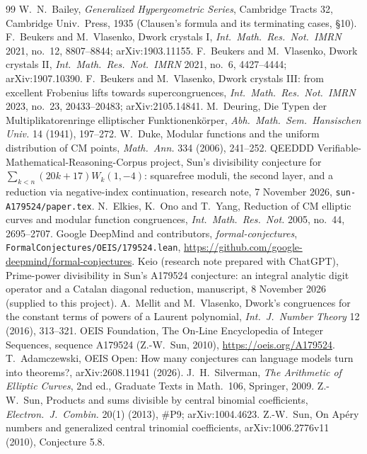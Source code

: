 \documentclass[11pt]{amsart}
\theoremstyle{definition}
\theoremstyle{remark}
\begin{document}
\begin{thebibliography}{99}
 W.~N.~Bailey, \emph{Generalized Hypergeometric Series}, Cambridge Tracts 32,
Cambridge Univ.\ Press, 1935 (Clausen's formula and its terminating cases, \S10).
 F.~Beukers and M.~Vlasenko, Dwork crystals I, \emph{Int.\ Math.\ Res.\ Not.\ IMRN}
2021, no.~12, 8807--8844; arXiv:1903.11155.
 F.~Beukers and M.~Vlasenko, Dwork crystals II, \emph{Int.\ Math.\ Res.\ Not.\ IMRN}
2021, no.~6, 4427--4444; arXiv:1907.10390.
 F.~Beukers and M.~Vlasenko, Dwork crystals III: from excellent Frobenius lifts towards
supercongruences, \emph{Int.\ Math.\ Res.\ Not.\ IMRN} 2023, no.~23, 20433--20483;
arXiv:2105.14841.
 M.~Deuring, Die Typen der Multiplikatorenringe elliptischer Funktionenk\"orper,
\emph{Abh.\ Math.\ Sem.\ Hansischen Univ.} 14 (1941), 197--272.
 W.~Duke, Modular functions and the uniform distribution of CM points,
\emph{Math.\ Ann.} 334 (2006), 241--252.
 QEEDDD Verifiable-Mathematical-Reasoning-Corpus project, Sun's divisibility
conjecture for $\sum_{k<n}(20k+17)W_k(1,-4)$: squarefree moduli, the second layer, and a reduction
via negative-index continuation, research note, 7 November 2026, \texttt{sun-A179524/paper.tex}.
 N.~Elkies, K.~Ono and T.~Yang, Reduction of CM elliptic curves and modular function
congruences, \emph{Int.\ Math.\ Res.\ Not.} 2005, no.~44, 2695--2707.
 Google DeepMind and contributors, \emph{formal-conjectures},
\texttt{FormalConjectures/OEIS/179524.lean},
\url{https://github.com/google-deepmind/formal-conjectures}.
 Keio (research note prepared with ChatGPT), Prime-power divisibility in Sun's A179524
conjecture: an integral analytic digit operator and a Catalan diagonal reduction, manuscript,
8 November 2026 (supplied to this project).
 A.~Mellit and M.~Vlasenko, Dwork's congruences for the constant terms of powers of a
Laurent polynomial, \emph{Int.\ J.\ Number Theory} 12 (2016), 313--321.
 OEIS Foundation, The On-Line Encyclopedia of Integer Sequences, sequence A179524
(Z.-W.~Sun, 2010), \url{https://oeis.org/A179524}.
 T.~Adamczewski, OEIS Open: How many conjectures can language models turn into
theorems?, arXiv:2608.11941 (2026).
 J.~H.~Silverman, \emph{The Arithmetic of Elliptic Curves}, 2nd ed., Graduate
Texts in Math.\ 106, Springer, 2009.
 Z.-W.~Sun, Products and sums divisible by central binomial coefficients,
\emph{Electron.\ J.\ Combin.} 20(1) (2013), \#P9; arXiv:1004.4623.
 Z.-W.~Sun, On Ap\'ery numbers and generalized central trinomial coefficients,
arXiv:1006.2776v11 (2010), Conjecture 5.8.
\end{thebibliography}
\end{document}
